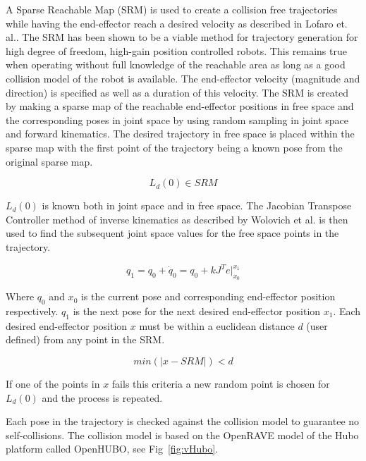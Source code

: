 

A Sparse Reachable Map (SRM) is used to create a collision free trajectories while having the end-effector reach a desired velocity as described in Lofaro et. al.\cite{dlofaro-srm}.
The SRM has been shown to be a viable method for trajectory generation for high degree of freedom, high-gain position controlled robots.  This remains true when operating without full knowledge of the reachable area as long as a good collision model of the robot is available. 
The end-effector velocity (magnitude and direction) is specified as well as a duration of this velocity. 
The SRM is created by making a sparse map of the reachable end-effector positions in free space and the corresponding poses in joint space by using random sampling in joint space and forward kinematics. 
The desired trajectory in free space is placed within the sparse map with the first point of the trajectory being a known pose from the original sparse map. 

\begin{equation}
L_d(0) \in SRM
\end{equation}

$L_d(0)$ is known both in joint space and in free space.
The Jacobian Transpose Controller method of inverse kinematics as described by Wolovich et al.\cite{4048118} is then used to find the subsequent joint space values for the free space points in the trajectory. 

\begin{equation}
q_1 = q_0 + \dot{q}_0 = q_0 + kJ^Te|_{x_0}^{x_1}
\end{equation}

Where $q_0$ and $x_0$ is the current pose and corresponding end-effector position respectively.  $q_1$ is the next pose for the next desired end-effector position $x_1$.
Each desired end-effector position $x$ must be within a euclidean distance $d$ (user defined) from any point in the SRM.

\begin{equation}
min \left(|x - SRM| \right) < d
\end{equation}

If one of the points in $x$ fails this criteria a new random point is chosen for $L_d(0)$ and the process is repeated.

Each pose in the trajectory is checked against the collision model to guarantee no self-collisions.  The collision model is based on the OpenRAVE model of the Hubo platform called OpenHUBO, see Fig~\ref{fig:vHubo}.

